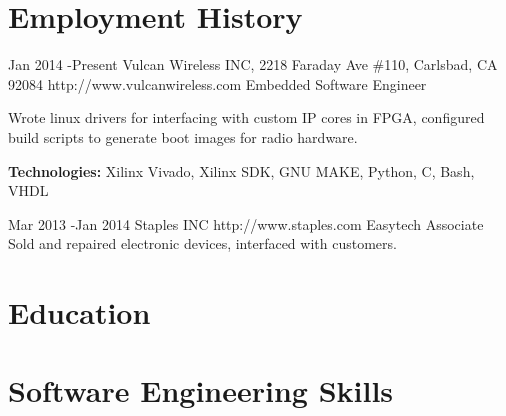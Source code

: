 \documentclass[10pt]{article} %
\begin{document}

\section{Employment History}

\job
{Jan 2014 -}{Present}
{Vulcan Wireless INC, 2218 Faraday Ave \#110, Carlsbad, CA 92084}
{http://www.vulcanwireless.com}
{Embedded Software Engineer}
{Wrote linux drivers for interfacing with custom IP cores in FPGA, configured build scripts to generate boot images for radio hardware.\\
\rule{0mm}{5mm}\textbf{Technologies:} Xilinx Vivado, Xilinx SDK, GNU MAKE, Python, C, Bash, VHDL}


\job
{Mar 2013 -}{Jan 2014}
{Staples INC}
{http://www.staples.com}
{Easytech Associate}
{Sold and repaired electronic devices, interfaced with customers.}


\section{Education}






\section{Software Engineering Skills}
\end{document}
